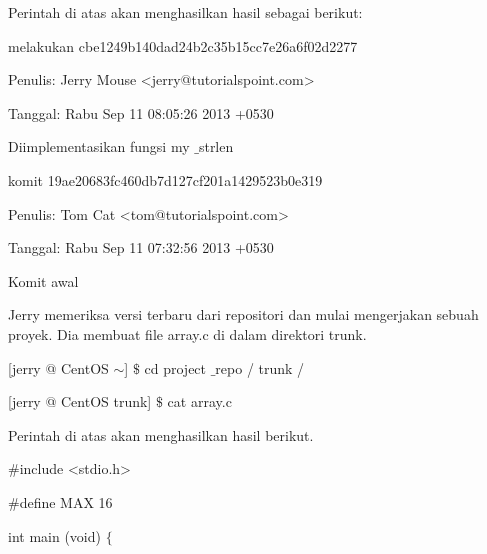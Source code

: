\noindent 
Perintah di atas akan menghasilkan hasil sebagai berikut: \par
\noindent 
 \hspace*{0.5in} melakukan cbe1249b140dad24b2c35b15cc7e26a6f02d2277 \par
\noindent 
 \hspace*{0.5in} Penulis: Jerry Mouse <jerry@tutorialspoint.com> \par
\noindent 
 \hspace*{0.5in} Tanggal: Rabu Sep 11 08:05:26 2013 +0530 \par
\noindent 
 \hspace*{0.5in} Diimplementasikan fungsi my $  \_  $strlen \par
\noindent 
 \hspace*{0.5in}  \hspace*{0.5in} komit 19ae20683fc460db7d127cf201a1429523b0e319 \par
\noindent 
 \hspace*{0.5in}  \hspace*{0.5in} Penulis: Tom Cat <tom@tutorialspoint.com> \par
\noindent 
 \hspace*{0.5in}  \hspace*{0.5in} Tanggal: Rabu Sep 11 07:32:56 2013 +0530 \par
\noindent 
Komit awal \par
\noindent 
 \hspace*{0.5in} Jerry memeriksa versi terbaru dari repositori dan mulai mengerjakan sebuah proyek. Dia  \hspace*{0.5in} membuat file array.c di dalam direktori trunk. \par
\noindent 
 \hspace*{0.5in} [jerry @ CentOS  $  \sim  $]  $  \$  $ cd project $  \_  $repo / trunk / \par
\noindent 
 \hspace*{0.5in} [jerry @ CentOS trunk]  $  \$  $ cat array.c \par
\noindent 
 \hspace*{0.5in} Perintah di atas akan menghasilkan hasil berikut. \par
\noindent 
 \hspace*{0.5in}  $  \#  $include <stdio.h> \par
\noindent 
 \hspace*{0.5in}  $  \#  $define MAX 16 \par
\noindent 
 \hspace*{0.5in} int main (void)  $  \{  $ \par
